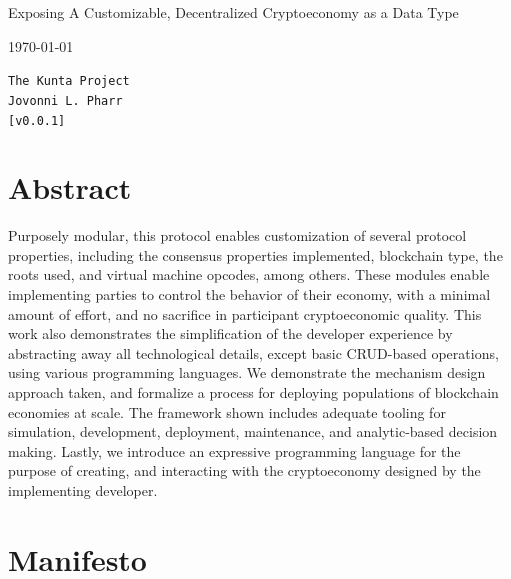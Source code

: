 \documentclass[12pt, titlepage, twocolumn]{report}
\date{\today}
\date{}
\begin{document}
\begin{titlepage}

\protect\parbox{.9\textwidth}
	{\protect\centering 
		\huge Exposing A Customizable, Decentralized Cryptoeconomy as a Data Type 
	}
\begin{center}
{\LARGE
\today}
\end{center}

\vfill
{
\Large
\begin{center}
\texttt{The Kunta Project} \\
\texttt{Jovonni L. Pharr} \\
\texttt{[v0.0.1]}
\end{center}
}
 



\vfill
\section*{Abstract}
\noindent

Purposely modular, this protocol enables customization of several protocol properties, including the consensus properties implemented, blockchain type, the roots used, and virtual machine opcodes, among others. These modules enable implementing parties to control the behavior of their economy, with a minimal amount of effort, and no sacrifice in participant cryptoeconomic quality. This work also demonstrates the simplification of the developer experience by abstracting away all technological details, except basic CRUD-based operations, using various programming languages. We demonstrate the mechanism design approach taken, and formalize a process for deploying populations of blockchain economies at scale. The framework shown includes adequate tooling for simulation, development, deployment, maintenance, and analytic-based decision making. Lastly, we introduce an expressive programming language for the purpose of creating, and interacting with the cryptoeconomy designed by the implementing developer.

\end{titlepage}


\tableofcontents
\listoffigures

\renewcommand\listoflistingscaption{List of Code Snippets}
\listoflistings

\clearpage


\onecolumn
\section{Manifesto}
\end{document}
